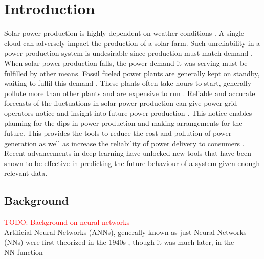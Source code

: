 \chapter{Introduction\label{cha:introduction}}

Solar power production is highly dependent on weather conditions \cite{lin_temporal_2020, lee_forecasting_2018, jaidee_very_2019, su_machine_2019, jang_solar_2016}. A single cloud can adversely impact the production of a solar farm. Such unreliability in a power production system is undesirable since production must match demand \cite{lee_forecasting_2018}. When solar power production falls, the power demand it was serving must be fulfilled by other means. Fossil fueled power plants are generally kept on standby, waiting to fulfil this demand \cite{lee_forecasting_2018}. These plants often take hours to start, generally pollute more than other plants and are expensive to run \cite{lee_forecasting_2018}.
Reliable and accurate forecasts of the fluctuations in solar power production can give power grid operators notice and insight into future power production \cite{lee_forecasting_2018}. This notice enables planning for the dips in power production and making arrangements for the future. This provides the tools to reduce the cost and pollution of power generation as well as increase the reliability of power delivery to consumers \cite{lee_forecasting_2018}.
Recent advancements in deep learning have unlocked new tools that have been shown to be effective in predicting the future behaviour of a system given enough relevant data.\\


\section{Background}

\textcolor{red}{TODO: Background on neural networks}\\
Artificial Neural Networks (ANNs), generally known as just Neural Networks (NNs) were first theorized in the 1940s \cite{citation needed}, though it was much later, in the\\
NN function\\


